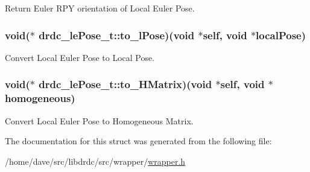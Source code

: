 Return Euler RPY orientation of Local Euler Pose. 

\hypertarget{structdrdc__lePose__t_f7480671009e647ae378282c177f5f6f}{
\subsubsection[to\_\-lPose]{\setlength{\rightskip}{0pt plus 5cm}void($\ast$ {\bf drdc\_\-lePose\_\-t::to\_\-lPose})(void $\ast$self, void $\ast$localPose)}}
\label{structdrdc__lePose__t_f7480671009e647ae378282c177f5f6f}


Convert Local Euler Pose to Local Pose. 

\hypertarget{structdrdc__lePose__t_00b46359c3bda2c6cd2c15628d193ce1}{
\subsubsection[to\_\-HMatrix]{\setlength{\rightskip}{0pt plus 5cm}void($\ast$ {\bf drdc\_\-lePose\_\-t::to\_\-HMatrix})(void $\ast$self, void $\ast$homogeneous)}}
\label{structdrdc__lePose__t_00b46359c3bda2c6cd2c15628d193ce1}


Convert Local Euler Pose to Homogeneous Matrix. 



The documentation for this struct was generated from the following file:\begin{CompactItemize}
\item 
/home/dave/src/libdrdc/src/wrapper/\hyperlink{wrapper_8h}{wrapper.h}\end{CompactItemize}
